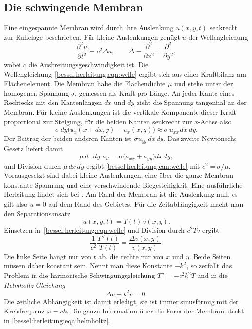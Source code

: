 \subsection{Die schwingende Membran
\label{bessel:herleitung:subsection:membran}}
Eine eingespannte Membran wird durch ihre Auslenkung $u(x,y,t)$ senkrecht zur Ruhelage beschrieben.
Für kleine Auslenkungen genügt $u$ der Wellengleichung
\begin{equation}
\frac{\partial^2 u}{\partial t^2}
=
c^2 \Delta u,
\qquad
\Delta
=
\frac{\partial^2}{\partial x^2}
+
\frac{\partial^2}{\partial y^2},
\label{bessel:herleitung:eqn:welle}
\end{equation}
wobei $c$ die Ausbreitungsgeschwindigkeit ist.
Die Wellengleichung~\eqref{bessel:herleitung:eqn:welle} ergibt sich aus einer Kraftbilanz am Flächenelement.
Die Membran habe die Flächendichte $\mu$ und stehe unter der homogenen Spannung $\sigma$, gemessen als Kraft pro Länge.
An jeder Kante eines Rechtecks mit den Kantenlängen $dx$ und $dy$ zieht die Spannung tangential an der Membran.
Für kleine Auslenkungen ist die vertikale Komponente dieser Kraft proportional zur Steigung, für die beiden Kanten senkrecht zur $x$-Achse also
\[
\sigma\,dy
\bigl(
u_x(x+dx,y) - u_x(x,y)
\bigr)
\approx
\sigma\, u_{xx}\, dx\, dy .
\]
Der Beitrag der beiden anderen Kanten ist $\sigma u_{yy}\,dx\,dy$.
Das zweite Newtonsche Gesetz liefert damit
\[
\mu\, dx\, dy\; u_{tt}
=
\sigma \bigl( u_{xx} + u_{yy} \bigr) dx\, dy ,
\]
und Division durch $\mu\,dx\,dy$ ergibt \eqref{bessel:herleitung:eqn:welle} mit $c^2 = \sigma/\mu$.
Vorausgesetzt sind dabei kleine Auslenkungen, eine über die ganze Membran konstante Spannung und eine verschwindende Biegesteifigkeit.
Eine ausführliche Herleitung findet sich bei \cite{bessel:courant}.
Am Rand der Membran ist die Auslenkung null, es gilt also $u=0$ auf dem Rand des Gebietes.
Für die Zeitabhängigkeit macht man den Separationsansatz
\begin{equation}
u(x,y,t)
=
T(t)\, v(x,y).
\label{bessel:herleitung:eqn:zeitsep}
\end{equation}
Einsetzen in~\eqref{bessel:herleitung:eqn:welle} und Division durch
$c^2Tv$ ergibt
\[
\frac{1}{c^2}\frac{T''(t)}{T(t)}
=
\frac{\Delta v(x,y)}{v(x,y)}.
\]
Die linke Seite hängt nur von $t$ ab, die rechte nur von $x$ und $y$.
Beide Seiten müssen daher konstant sein.
Nennt man diese Konstante $-k^2$, so zerfällt das Problem in die harmonische Schwingungsgleichung $T''=-c^2k^2T$ und in die
\emph{Helmholtz-Gleichung}
%
\begin{equation}
\Delta v + k^2 v = 0.
\label{bessel:herleitung:eqn:helmholtz}
\end{equation}
Die zeitliche Abhängigkeit ist damit erledigt, sie ist immer sinusförmig mit der Kreisfrequenz $\omega = ck$.
Die ganze Information über die Form der Membran steckt in
\eqref{bessel:herleitung:eqn:helmholtz}.
%
%
